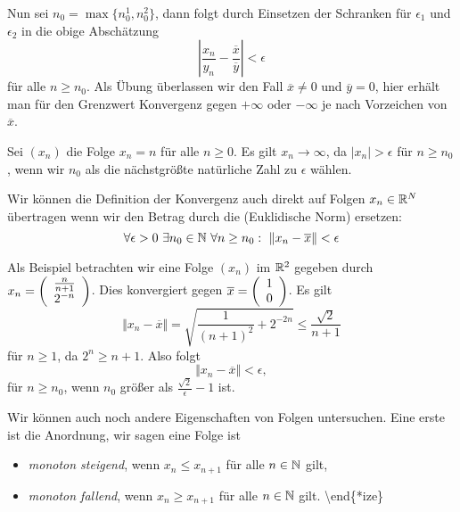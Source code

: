 Nun sei \(n_0 = \max\{n_0^1,n_0^2\}\), dann folgt durch Einsetzen der Schranken für \(\epsilon_1\) und \(\epsilon_2\) in die obige Abschätzung
\begin{equation*}
  \left\vert \frac{x_n}{y_n} -\frac{\overline{x}}{\overline{y}} \right\vert < \epsilon\end{equation*}
für alle \(n \geq n_0\). Als Übung überlassen wir den Fall \(\overline{x} \neq 0\) und \(\overline{y}=0\), hier erhält man für den Grenzwert Konvergenz gegen \(+\infty\) oder \(-\infty\) je nach Vorzeichen von \(\overline{x}\).
\label{vorkurs/folgen:example-5}
\begin{example}{}{}



Sei \((x_n)\) die  Folge \(x_n = n \) für alle \(n\geq 0\). Es gilt \(x_n \rightarrow \infty\), da \(\vert x_n \vert > \epsilon\) für \(n\geq n_0\), wenn wir \(n_0\) als die nächstgrößte natürliche Zahl zu \(\epsilon\) wählen.
\end{example}

Wir können die Definition der Konvergenz auch direkt auf Folgen \(x_n \in \mathbb{R}^N\) übertragen wenn wir den Betrag durch die (Euklidische Norm) ersetzen:
\begin{equation*}
 \forall \epsilon > 0 ~\exists n_0 \in \mathbb{N} ~\forall n \geq n_0: ~\Vert x_n - \overline{x} \Vert < \epsilon\end{equation*}\label{vorkurs/folgen:example-6}
\begin{example}{}{}



Als Beispiel betrachten wir eine Folge \((x_n)\) im \(\mathbb{R}^2\) gegeben durch \(x_n= \left( \begin{array}{c} \frac{n}{n+1} \\ 2^{-n} \end{array} \right)\). Dies konvergiert gegen \(\overline{x}=\left( \begin{array}{c} 1 \\ 0 \end{array} \right)\). Es gilt
\begin{equation*}
 \Vert x_n - \overline{x} \Vert = \sqrt{\frac{1}{(n+1)^2} + 2^{-2n}} \leq \frac{\sqrt{2}}{n+1}\end{equation*}
für \(n \geq 1\), da \(2^n \geq n+1\). Also folgt
\begin{equation*}
 \Vert x_n - \overline{x} \Vert < \epsilon,\end{equation*}
für \(n \geq n_0\), wenn \(n_0\) größer als \(\frac{\sqrt{2}}\epsilon -1\) ist.
\end{example}

Wir können auch noch andere Eigenschaften von Folgen untersuchen. Eine erste ist die Anordnung, wir sagen eine Folge ist
\begin{itemize}
\item {} 
\emph{monoton steigend}, wenn \(x_n \leq x_{n+1}\) für alle \(n\in \mathbb{N}\) gilt,

\item {} 
\emph{monoton fallend}, wenn \(x_n \geq x_{n+1}\) für alle \(n\in \mathbb{N}\) gilt.
\textbackslash{}end\{*ize\}

\end{itemize}

